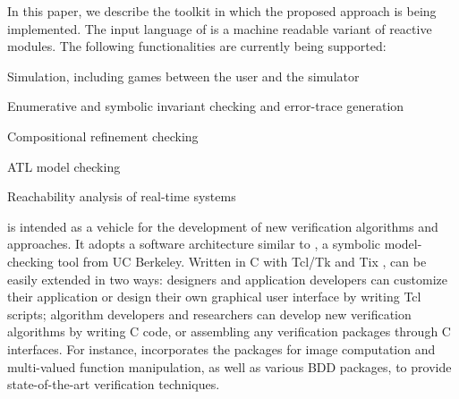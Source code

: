 


\noindent
In this paper, we describe the toolkit \mocha in which the
proposed approach is being implemented.  The input language of \mocha
is a machine readable variant of reactive modules.
The following functionalities are currently being supported:

\begin{itemize}
\vitem
Simulation, including games between the user and the simulator

\vitem
Enumerative and symbolic invariant checking and error-trace generation

\vitem
Compositional refinement checking

\vitem
ATL model checking 

\vitem
Reachability analysis of real-time systems
\end{itemize}

\noindent
\mocha is intended as a vehicle for the development of new
verification algorithms and approaches.  It adopts a software
architecture similar to \vis \cite{VIS96} , a symbolic model-checking
tool from UC Berkeley.  Written in C with Tcl/Tk and Tix
\cite{tix-http}, \mocha can be easily extended in two ways: designers
and application developers can customize their application or design
their own graphical user interface by writing Tcl scripts; algorithm
developers and researchers can develop new verification algorithms by
writing C code, or assembling any verification packages through C
interfaces.  For instance, \mocha incorporates the \vis packages
for image computation and multi-valued function manipulation, as well
as various BDD packages, to provide state-of-the-art verification
techniques.


